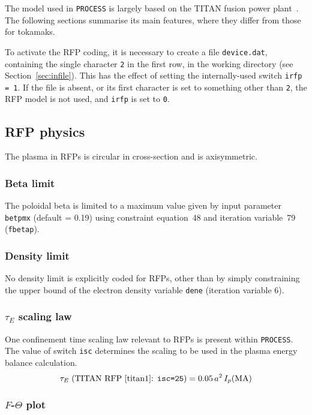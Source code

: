 \documentclass[11pt,a4paper]{report}
\newcommand{\process}{\mbox{\texttt{PROCESS}}}
\begin{document}
The model used in \process\/ is largely based on the TITAN fusion power
plant~\cite{titan1,titan2}. The following sections summarise its main
features, where they differ from those for tokamaks.

To activate the RFP coding, it is necessary to create a file
\texttt{device.dat}, containing the single character \texttt{2} in the first
row, in the working directory (see Section~\ref{sec:infile}). This has the
effect of setting the internally-used switch \texttt{irfp = 1}. If the file is
absent, or its first character is set to something other than \texttt{2}, the
RFP model is not used, and \texttt{irfp} is set to \texttt{0}.

\subsection{RFP physics}

The plasma in RFPs is circular in cross-section and is axisymmetric.

\subsubsection{Beta limit}

The poloidal beta is limited to a maximum value given by input parameter
\texttt{betpmx} (default = 0.19) using constraint equation~48 and iteration
variable~79 (\texttt{fbetap}).

\subsubsection{Density limit}

No density limit is explicitly coded for RFPs, other than by simply
constraining the upper bound of the electron density variable \texttt{dene}
(iteration variable 6).

\subsubsection{$\tau_E$ scaling law}

One confinement time scaling law relevant to RFPs is present within
\process. The value of switch \texttt{isc} determines the scaling to be used
in the plasma energy balance calculation.
\[
\tau_E\; (\mbox{TITAN RFP~\cite{titan1}: \texttt{isc=25}})
 = 0.05 \, a^2 \, I_p(\mathrm{MA})
\]

\subsubsection{$F$-$\Theta$ plot}
\end{document}
